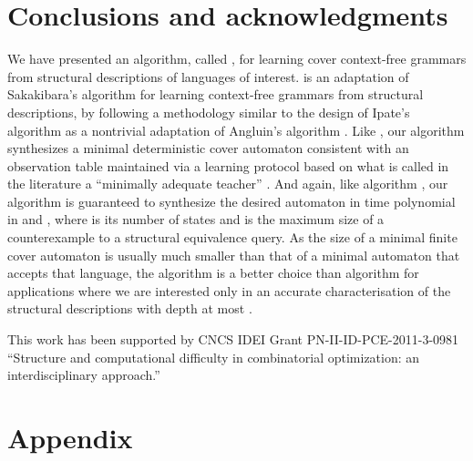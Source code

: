 \documentclass[preprint,12pt,english]{article}
\begin{document}
\section{Conclusions and acknowledgments}
\label{sect6}
We have presented an algorithm, called , for learning cover context-free grammars from structural descriptions of languages of interest.  is an adaptation of Sakakibara's algorithm  for learning context-free grammars from structural descriptions, by following a methodology similar to the design of Ipate's algorithm  as a nontrivial adaptation of Angluin's algorithm . Like , our algorithm synthesizes  a minimal deterministic cover automaton consistent with an observation table maintained via a learning protocol based on what is called in the literature a ``minimally adequate teacher'' \cite{Angluin:87}. And again, like algorithm , our algorithm is guaranteed to synthesize the desired automaton in time  polynomial in  and , where  is its number of states and  is the maximum size of a counterexample to a  structural equivalence query. As the size of a minimal finite cover automaton is usually much smaller than that of a minimal automaton that accepts that language, the algorithm  is a  better choice than algorithm  for applications where we are interested only in an accurate characterisation of the structural descriptions with depth at most .

This work has been supported by CNCS IDEI Grant PN-II-ID-PCE-2011-3-0981 ``Structure and computational difficulty in combinatorial
optimization: an interdisciplinary approach.''



\newpage
\section*{Appendix}
\end{document}
